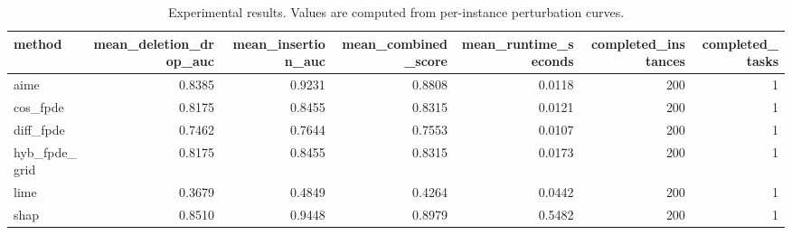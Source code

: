 \begin{table}[t]
\caption{Experimental results. Values are computed from per-instance perturbation curves.}
\label{tab:main_results_computed}
\centering
\begin{tabular}{lrrrrrr}
\toprule
method & mean\_deletion\_drop\_auc & mean\_insertion\_auc & mean\_combined\_score & mean\_runtime\_seconds & completed\_instances & completed\_tasks \\
\midrule
aime & 0.8385 & 0.9231 & 0.8808 & 0.0118 & 200 & 1 \\
cos\_fpde & 0.8175 & 0.8455 & 0.8315 & 0.0121 & 200 & 1 \\
diff\_fpde & 0.7462 & 0.7644 & 0.7553 & 0.0107 & 200 & 1 \\
hyb\_fpde\_grid & 0.8175 & 0.8455 & 0.8315 & 0.0173 & 200 & 1 \\
lime & 0.3679 & 0.4849 & 0.4264 & 0.0442 & 200 & 1 \\
shap & 0.8510 & 0.9448 & 0.8979 & 0.5482 & 200 & 1 \\
\bottomrule
\end{tabular}

\end{table}
